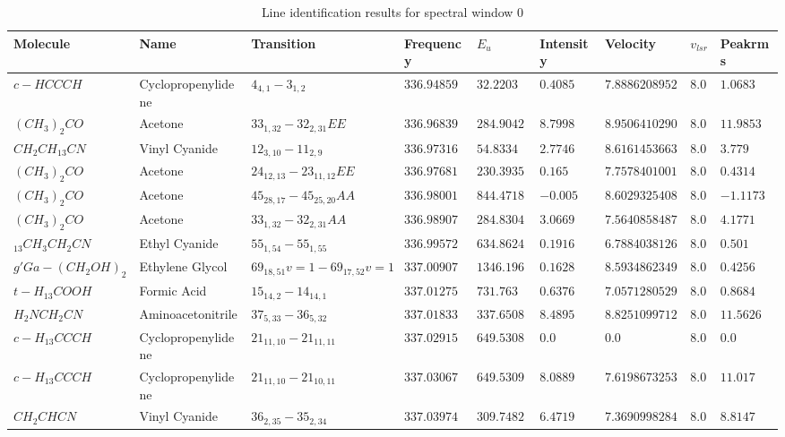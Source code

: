 \documentclass{aa}
\begin{document}
 \begin{table}   
 \label{table:1}  
     \caption{Line identification results for spectral window 0}
 \tiny
    \centering    
    \begin{tabular}{l l l l l l l l l} 
    \hline\hline       
    Molecule & Name &Transition & Frequency & $E_{u}$ & Intensity & Velocity & $v_{lsr}$ & Peakrms\\ 
    \hline    
$c-HCCCH$ & Cyclopropenylidene & $4_{4,1}-3_{1,2}$ & $336.94859$ & $32.2203$ & $0.4085$ & $7.88862089526$ & $8.0$ & $1.0683$\\
$(CH_{3})_{2}CO$ & Acetone & $33_{1,32}-32_{2,31}EE$ & $336.96839$ & $284.9042$ & $8.7998$ & $8.95064102901$ & $8.0$ & $11.9853$\\
$CH_{2}CH_{13}CN$ & Vinyl Cyanide & $12_{3,10}-11_{2,9}$ & $336.97316$ & $54.8334$ & $2.7746$ & $8.61614536631$ & $8.0$ & $3.779$\\
$(CH_{3})_{2}CO$ & Acetone & $24_{12,13}-23_{11,12}EE$ & $336.97681$ & $230.3935$ & $0.165$ & $7.75784010018$ & $8.0$ & $0.4314$\\
$(CH_{3})_{2}CO$ & Acetone & $45_{28,17}-45_{25,20}AA$ & $336.98001$ & $844.4718$ & $-0.005$ & $8.6029325408$ & $8.0$ & $-1.1173$\\
$(CH_{3})_{2}CO$ & Acetone & $33_{1,32}-32_{2,31}AA$ & $336.98907$ & $284.8304$ & $3.0669$ & $7.56408584877$ & $8.0$ & $4.1771$\\
$_{13}CH_{3}CH_{2}CN$ & Ethyl Cyanide & $55_{1,54}-55_{1,55}$ & $336.99572$ & $634.8624$ & $0.1916$ & $6.78840381265$ & $8.0$ & $0.501$\\
$g'Ga-(CH_{2}OH)_{2}$ & Ethylene Glycol & $69_{18,51}v=1-69_{17,52}v=1$ & $337.00907$ & $1346.1964$ & $0.1628$ & $8.5934862349$ & $8.0$ & $0.4256$\\
$t-H_{13}COOH$ & Formic Acid & $15_{14,2}-14_{14,1}$ & $337.01275$ & $731.763$ & $0.6376$ & $7.05712805295$ & $8.0$ & $0.8684$\\
$H_{2}NCH_{2}CN$ & Aminoacetonitrile & $37_{5,33}-36_{5,32}$ & $337.01833$ & $337.6508$ & $8.4895$ & $8.82510997129$ & $8.0$ & $11.5626$\\
$c-H_{13}CCCH$ & Cyclopropenylidene & $21_{11,10}-21_{11,11}$ & $337.02915$ & $649.5308$ & $0.0$ & $0.0$ & $8.0$ & $0.0$\\
$c-H_{13}CCCH$ & Cyclopropenylidene & $21_{11,10}-21_{10,11}$ & $337.03067$ & $649.5309$ & $8.0889$ & $7.61986732531$ & $8.0$ & $11.017$\\
$CH_{2}CHCN$ & Vinyl Cyanide & $36_{2,35}-35_{2,34}$ & $337.03974$ & $309.7482$ & $6.4719$ & $7.36909982843$ & $8.0$ & $8.8147$\\

\end{tabular}
\end{table}
\end{document}
